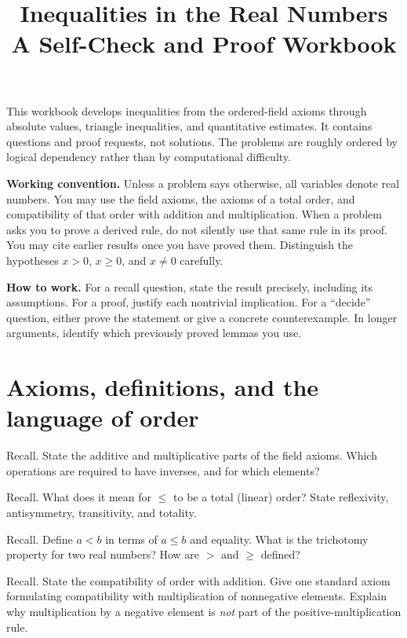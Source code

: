 \documentclass{workbook}
\title{Inequalities in the Real Numbers\\
\large A Self-Check and Proof Workbook}
\author{}
\date{}
\begin{document}
\maketitle

\noindent
This workbook develops inequalities from the ordered-field axioms through
absolute values, triangle inequalities, and quantitative estimates. It
contains questions and proof requests, not solutions. The problems are roughly
ordered by logical dependency rather than by computational difficulty.

\medskip\noindent
\textbf{Working convention.} Unless a problem says otherwise, all variables
denote real numbers. You may use the field axioms, the axioms of a total order,
and compatibility of that order with addition and multiplication. When a
problem asks you to prove a derived rule, do not silently use that same rule
in its proof. You may cite earlier results once you have proved them.
Distinguish the hypotheses $x>0$, $x\geq 0$, and $x\neq 0$ carefully.

\medskip\noindent
\textbf{How to work.} For a recall question, state the result precisely,
including its assumptions. For a proof, justify each nontrivial implication.
For a ``decide'' question, either prove the statement or give a concrete
counterexample. In longer arguments, identify which previously proved lemmas
you use.

\section{Axioms, definitions, and the language of order}

\begin{problem}{Recall.}
State the additive and multiplicative parts of the field axioms. Which
operations are required to have inverses, and for which elements?
\end{problem}

\begin{problem}{Recall.}
What does it mean for $\leq$ to be a total (linear) order? State
reflexivity, antisymmetry, transitivity, and totality.
\end{problem}

\begin{problem}{Recall.}
Define $a<b$ in terms of $a\leq b$ and equality. What is the trichotomy
property for two real numbers? How are $>$ and $\geq$ defined?
\end{problem}

\begin{problem}{Recall.}
State the compatibility of order with addition. Give one standard axiom
formulating compatibility with multiplication of nonnegative elements.
Explain why multiplication by a negative element is \emph{not} part of the
positive-multiplication rule.
\end{problem}
\end{document}
